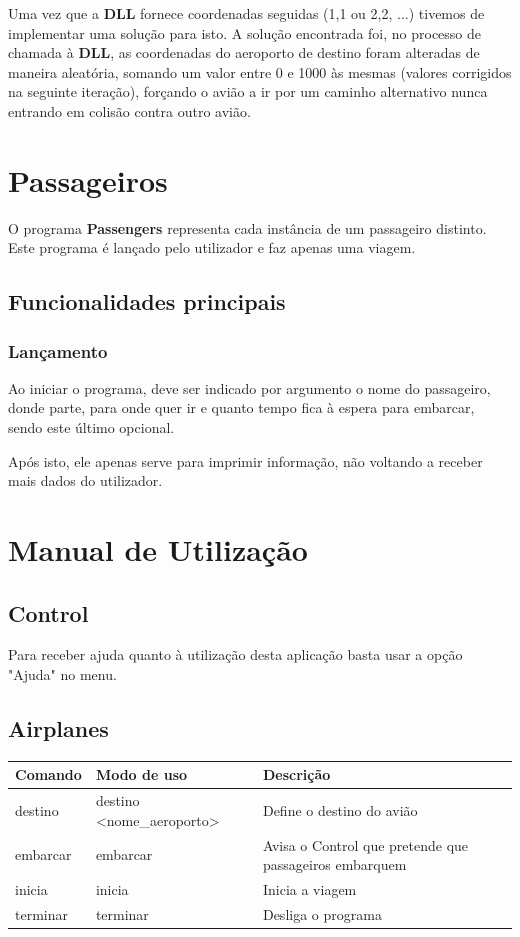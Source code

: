 \documentclass[11pt]{article}
\begin{document}
	Uma vez que a \textbf{DLL} fornece coordenadas seguidas (1,1 ou 2,2, ...) tivemos de implementar uma solução para isto. A solução encontrada foi, no processo de chamada à \textbf{DLL}, as coordenadas do aeroporto de destino foram alteradas de maneira aleatória, somando um valor entre 0 e 1000 às mesmas (valores corrigidos na seguinte iteração), forçando o avião a ir por um caminho alternativo nunca entrando em colisão contra outro avião.
	
	
	\large
	\section{Passageiros}
	\normalsize

    O programa \textbf{Passengers} representa cada instância de um passageiro distinto. Este programa é lançado pelo utilizador e faz apenas uma viagem. 
    
    
    \large
	\subsection{Funcionalidades principais}
	\subsubsection{Lançamento}
	\normalsize
	
	Ao iniciar o programa, deve ser indicado por argumento o nome do passageiro, donde parte, para onde quer ir e quanto tempo fica à espera para embarcar, sendo este último opcional.
	
	Após isto, ele apenas serve para imprimir informação, não voltando a receber mais dados do utilizador.
    

	\large
	\section{Manual de Utilização}
	\subsection{Control}
	\normalsize
	
	Para receber ajuda quanto à utilização desta aplicação basta usar a opção "Ajuda" no menu.
	
	
	\large
	\subsection{Airplanes}
	\normalsize
	
	\begin{tabularx}{\textwidth}{|l|X|X|}
	    \hline
	    \textbf{Comando} & \textbf{Modo de uso} & \textbf{Descrição} \\
	    \hline
	    destino & destino \textless{nome\_aeroporto}\textgreater & Define o destino do avião \\
	    \hline
	    embarcar & embarcar & Avisa o Control que pretende que passageiros embarquem \\
	    \hline
	    inicia & inicia & Inicia a viagem \\
	    \hline
	    terminar & terminar & Desliga o programa \\
	    \hline
	\end{tabularx}
	
\end{document}
